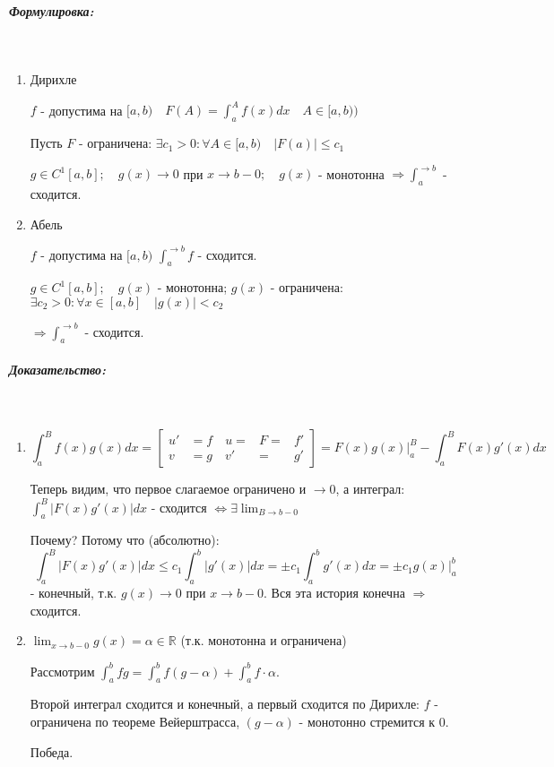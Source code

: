 \documentclass{article}
\let\vanillasubparagraph\subparagraph
\renewcommand{\subparagraph}[1]{\vanillasubparagraph{#1}\mbox{}\\}
\begin{document}
\subparagraph{Формулировка: }
\begin{enumerate}
    \item Дирихле

        $f$ - допустима на $[a, b) \quad F(A) = \int_a^A f(x) dx \quad A \in [a, b))$

        Пусть $F$ - ограничена: $\exists c_1 > 0: \forall A \in [a, b)\quad |F(a)| \leq c_1$

        $g \in C^1[a, b];\quad g(x) \to 0$ при $x \to b - 0;\quad g(x)$ - монотонна $\Rightarrow \int_{a}^{\to b}$ - сходится.

    \item Абель

        $f$ - допустима на $[a, b)$ $\int_a^{\to b} f$ - сходится. 

        $g \in C^1[a, b]; \quad g(x) $ - монотонна; $g(x)$ - ограничена: $\exists c_2 > 0: \forall x \in [a, b]\quad | g(x)| < c_2$

        $\Rightarrow \int_a^{\to b}$ - сходится.
\end{enumerate}

\subparagraph{Доказательство: }
\begin{enumerate}
    \item 

        $$
        \int_a^B f(x) g(x)dx = 
        \left[
            \begin{alignedat}{2}
                u' &= f \quad u = &F = &f'\\
                v &= g \quad v' &= &g'
        \end{alignedat}
        \right]
         = F(x)g(x)|_a^B - \int_a^B F(x)g'(x)dx
        $$

        Теперь видим, что первое слагаемое ограничено и $\to 0$, а интеграл:
        $\int_a^B |F(x)g'(x)|dx$ - сходится $\Leftrightarrow \exists \lim_{B \to b - 0}$ 

        Почему? Потому что (абсолютно): 
        $$
        \int_a^B |F(x)g'(x)|dx \leq c_1 \int_a^b |g'(x)| dx = \pm c_1 \int_a^bg'(x)dx = \pm c_1 g(x)|_a^b
        $$
        - конечный, т.к. $g(x) \to 0$ при $x \to b - 0$. Вся эта история конечна $\Rightarrow$ сходится.
    \item 
        $\lim_{x\to b - 0}g(x) = \alpha \in \mathbb R$ (т.к. монотонна и ограничена)

        Рассмотрим $\int_a^b fg = \int_a^b f(g - \alpha) + \int_a^b f\cdot \alpha$. 

        Второй интеграл сходится и конечный, а первый сходится по Дирихле: $f$ - ограничена по теореме Вейерштрасса, $(g - \alpha)$ - монотонно стремится к $0$.

        Победа.
\end{enumerate}
\end{document}
